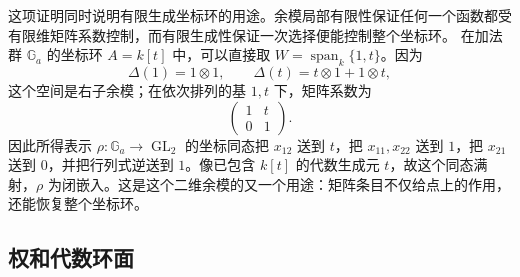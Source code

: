 这项证明同时说明有限生成坐标环的用途。余模局部有限性保证任何一个函数都受有限维矩阵系数控制，而有限生成性保证一次选择便能控制整个坐标环。
\ProseParagraphBreak
在加法群 \(\mathbb G_a\) 的坐标环 \(A=k[t]\) 中，可以直接取 \(W=\operatorname{span}_k\{1,t\}\)。因为
\[
	\Delta(1)=1\otimes1,\qquad \Delta(t)=t\otimes1+1\otimes t,
\]
这个空间是右子余模；在依次排列的基 \(1,t\) 下，矩阵系数为
\[
	\begin{pmatrix}1&t\\0&1\end{pmatrix}.
\]
因此所得表示 \(\rho:\mathbb G_a\to\operatorname{GL}_2\) 的坐标同态把 \(x_{12}\) 送到 \(t\)，把 \(x_{11},x_{22}\) 送到 \(1\)，把 \(x_{21}\) 送到 \(0\)，并把行列式逆送到 \(1\)。像已包含 \(k[t]\) 的代数生成元 \(t\)，故这个同态满射，\(\rho\) 为闭嵌入。这是这个二维余模的又一个用途：矩阵条目不仅给点上的作用，还能恢复整个坐标环。

\subsection{权和代数环面}
\label{b5:subsec:2103:02}

